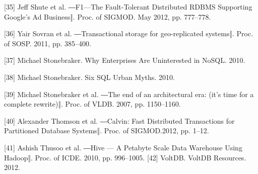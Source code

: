 \documentclass[letterpaper,twocolumn,10pt]{article}
\begin{document}
[35] Jeff Shute et al. ―F1—The Fault-Tolerant Distributed RDBMS Supporting Google’s Ad Business‖. Proc. of SIGMOD. May 2012, pp. 777–778.

[36] Yair Sovran et al. ―Transactional storage for geo-replicated systems‖. Proc. of SOSP. 2011, pp. 385–400.

[37] Michael Stonebraker. Why Enterprises Are Uninterested in NoSQL. 2010.

[38] Michael Stonebraker. Six SQL Urban Myths. 2010.

[39] Michael Stonebraker et al. ―The end of an architectural era: (it’s time for a complete rewrite)‖. Proc. of VLDB. 2007, pp. 1150–1160.

[40] Alexander Thomson et al. ―Calvin: Fast Distributed Transactions for Partitioned Database Systems‖. Proc. of SIGMOD.2012, pp. 1–12.

[41] Ashish Thusoo et al. ―Hive — A Petabyte Scale Data Warehouse Using Hadoop‖. Proc. of ICDE. 2010, pp. 996–1005.
[42] VoltDB. VoltDB Resources. 2012.
\end{document}
